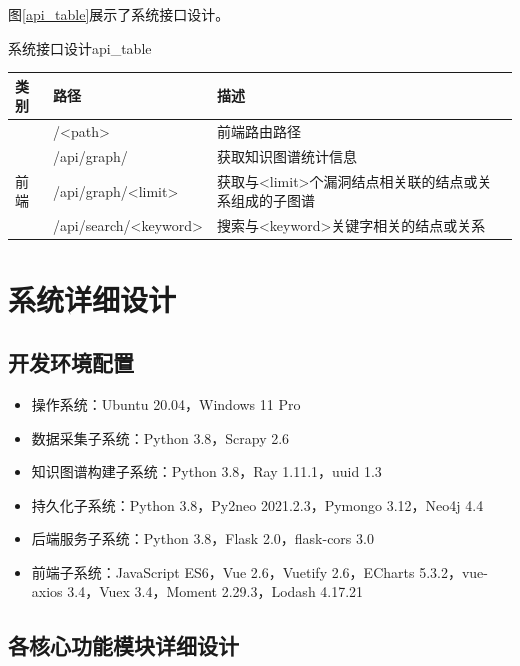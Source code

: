 \documentclass[a4paper,AutoFakeBold,oneside,12pt]{book}
\begin{document}
图\ref{api_table}展示了系统接口设计。
\begin{bupttable}{系统接口设计}{api_table}
	\begin{tabularx}{\textwidth}{llX}
		\toprule
		\textbf{类别} & \textbf{路径}         & \textbf{描述}                                         \\ \midrule
		              & /<path>               & 前端路由路径                                          \\ \cmidrule(l){2-3}
		              & /api/graph/           & 获取知识图谱统计信息                                  \\ \cmidrule(l){2-3}
		前端          & /api/graph/<limit>    & 获取与<limit>个漏洞结点相关联的结点或关系组成的子图谱 \\ \cmidrule(l){2-3}
		              & /api/search/<keyword> & 搜索与<keyword>关键字相关的结点或关系                 \\ \bottomrule %
	\end{tabularx}
\end{bupttable}

\section{系统详细设计}

\subsection{开发环境配置}

\begin{itemize}
	\item 操作系统：Ubuntu 20.04，Windows 11 Pro
	\item 数据采集子系统：Python 3.8，Scrapy 2.6
	\item 知识图谱构建子系统：Python 3.8，Ray 1.11.1，uuid 1.3
	\item 持久化子系统：Python 3.8，Py2neo 2021.2.3，Pymongo 3.12，Neo4j 4.4
	\item 后端服务子系统：Python 3.8，Flask 2.0，flask-cors 3.0
	\item 前端子系统：JavaScript ES6，Vue 2.6，Vuetify 2.6，ECharts 5.3.2，vue-axios 3.4，Vuex 3.4，Moment 2.29.3，Lodash 4.17.21
\end{itemize}

\subsection{各核心功能模块详细设计}
\end{document}
